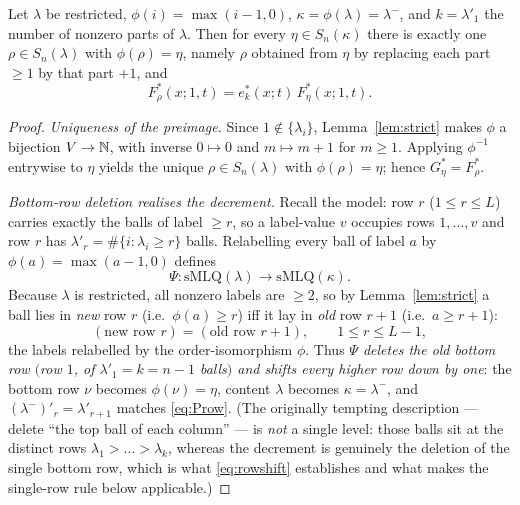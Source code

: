 \begin{qthreelemma}\label{lem:decrement}
Let $\lambda$ be restricted, $\phi(i)=\max(i-1,0)$, $\kappa=\phi(\lambda)=\lambda^-$,
and $k=\lambda'_1$ the number of nonzero parts of $\lambda$. Then for every
$\eta\in S_n(\kappa)$ there is exactly one $\rho\in S_n(\lambda)$ with
$\phi(\rho)=\eta$, namely $\rho$ obtained from $\eta$ by replacing each part $\ge1$
by that part $+1$, and
\[
F^*_\rho(x;1,t)=e^*_k(x;t)\,F^*_\eta(x;1,t).
\]
\end{qthreelemma}

\begin{proof}
\emph{Uniqueness of the preimage.} Since $1\notin\{\lambda_i\}$, Lemma~\ref{lem:strict}
makes $\phi$ a bijection $V\to\mathbb{N}$, with inverse $0\mapsto0$ and $m\mapsto m+1$
for $m\ge1$. Applying $\phi^{-1}$ entrywise to $\eta$ yields the unique
$\rho\in S_n(\lambda)$ with $\phi(\rho)=\eta$; hence $G^*_\eta=F^*_\rho$.

\emph{Bottom-row deletion realises the decrement.} Recall the model: row $r$
($1\le r\le L$) carries exactly the balls of label $\ge r$, so a label-value $v$
occupies rows $1,\dots,v$ and row $r$ has $\lambda'_r=\#\{i:\lambda_i\ge r\}$ balls.
Relabelling every ball of label $a$ by $\phi(a)=\max(a-1,0)$ defines
\[
\Psi:\mathrm{sMLQ}(\lambda)\longrightarrow\mathrm{sMLQ}(\kappa).
\]
Because $\lambda$ is restricted, all nonzero labels are $\ge2$, so by
Lemma~\ref{lem:strict} a ball lies in \emph{new} row $r$ (i.e.\ $\phi(a)\ge r$) iff
it lay in \emph{old} row $r+1$ (i.e.\ $a\ge r+1$):
\begin{equation}\label{eq:rowshift}
(\text{new row }r)=(\text{old row }r+1),\qquad 1\le r\le L-1,
\end{equation}
the labels relabelled by the order-isomorphism $\phi$. Thus \emph{$\Psi$ deletes the
old bottom row $($row $1$, of $\lambda'_1=k=n-1$ balls$)$ and shifts every higher row
down by one}: the bottom row $\nu$ becomes $\phi(\nu)=\eta$, content $\lambda$ becomes
$\kappa=\lambda^-$, and $(\lambda^-)'_r=\lambda'_{r+1}$ matches \eqref{eq:Prow}.
(The originally tempting description --- delete ``the top ball of each column'' ---
is \emph{not} a single level: those balls sit at the distinct rows
$\lambda_1>\dots>\lambda_k$, whereas the decrement is genuinely the deletion of the
single bottom row, which is what \eqref{eq:rowshift} establishes and what makes the
single-row rule below applicable.)


\end{proof}
